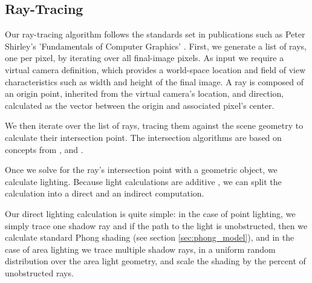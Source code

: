 \subsection{Ray-Tracing}
\label{sec:rendering_ray_tracing}
Our ray-tracing algorithm follows the standards set in publications such as Peter Shirley's 'Fundamentals of Computer Graphics' \cite{bib:shirley_fundamentals}. First, we generate a list of rays, one per pixel, by iterating over all final-image pixels. As input we require a virtual camera definition, which provides a world-space location and field of view characteristics such as width and height of the final image. A ray is composed of an origin point, inherited from the virtual camera's location, and direction, calculated as the vector between the origin and associated pixel's center.

We then iterate over the list of rays, tracing them against the scene geometry to calculate their intersection point. The intersection algorithms are based on concepts from \cite{bib:pbr}, and \cite{verth:2008}.

Once we solve for the ray's intersection point with a geometric object, we calculate lighting. Because light calculations are additive \cite{bib:pbr}, we can split the calculation into a direct and an indirect computation.

Our direct lighting calculation is quite simple: in the case of point lighting, we simply trace one shadow ray \cite{bib:pbr} and if the path to the light is unobstructed, then we calculate standard Phong shading (see section \ref{sec:phong_model}), and in the case of area lighting we trace multiple shadow rays, in a uniform random distribution over the area light geometry, and scale the shading by the percent of unobstructed rays.

%

